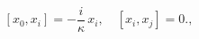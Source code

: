 \begin{equation}\label{5}
  [x_0, x_i] = -\frac{i}{\kappa}\, x_i, \quad [x_i, x_j] = 0.,
\end{equation}


